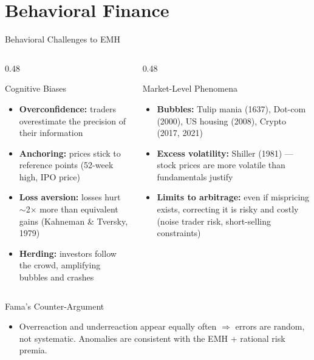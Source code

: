 \documentclass[9pt, aspectratio=169, t]{beamer}
\theoremstyle{definition}
\newenvironment{cminipage}[1]{%
    \par\noindent\hfill\begin{minipage}{#1}\ignorespaces
}{%
    \end{minipage}\hfill\null\par
}
\begin{document}
\section{Behavioral Finance}

\begin{frame}{Behavioral Challenges to EMH}
\begin{cminipage}{0.95\textwidth}
\begin{columns}[T]
\begin{column}{0.48\textwidth}
\begin{block}{Cognitive Biases}
\begin{itemize}\setlength{\itemsep}{0pt}
    \item \textbf{Overconfidence:} traders overestimate the precision of their information
    \item \textbf{Anchoring:} prices stick to reference points (52-week high, IPO price)
    \item \textbf{Loss aversion:} losses hurt $\sim$2$\times$ more than equivalent gains (Kahneman \& Tversky, 1979)
    \item \textbf{Herding:} investors follow the crowd, amplifying bubbles and crashes
\end{itemize}
\end{block}
\end{column}
\begin{column}{0.48\textwidth}
\begin{block}{Market-Level Phenomena}
\begin{itemize}\setlength{\itemsep}{0pt}
    \item \textbf{Bubbles:} Tulip mania (1637), Dot-com (2000), US housing (2008), Crypto (2017, 2021)
    \item \textbf{Excess volatility:} Shiller (1981) --- stock prices are more volatile than fundamentals justify
    \item \textbf{Limits to arbitrage:} even if mispricing exists, correcting it is risky and costly (noise trader risk, short-selling constraints)
\end{itemize}
\end{block}
\end{column}
\end{columns}

\vspace{0.2cm}
\begin{exampleblock}{Fama's Counter-Argument}
\begin{itemize}\setlength{\itemsep}{0pt}
    \item Overreaction and underreaction appear equally often $\Rightarrow$ errors are random, not systematic. Anomalies are consistent with the EMH + rational risk premia.
\end{itemize}
\end{exampleblock}
\end{cminipage}
\end{frame}
\end{document}
